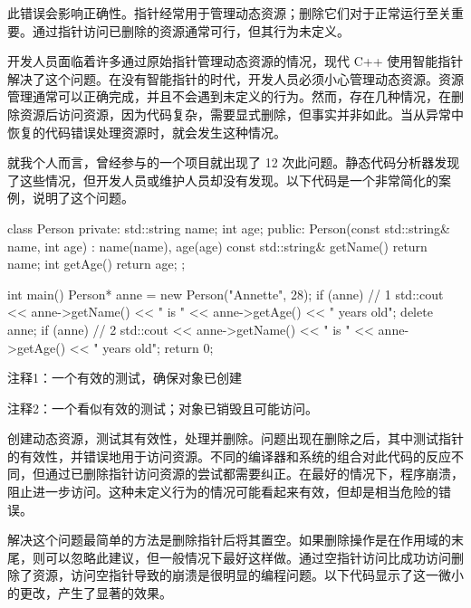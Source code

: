 此错误会影响正确性。指针经常用于管理动态资源；删除它们对于正常运行至关重要。通过指针访问已删除的资源通常可行，但其行为未定义。


开发人员面临着许多通过原始指针管理动态资源的情况，现代 C++ 使用智能指针解决了这个问题。在没有智能指针的时代，开发人员必须小心管理动态资源。资源管理通常可以正确完成，并且不会遇到未定义的行为。然而，存在几种情况，在删除资源后访问资源，因为代码复杂，需要显式删除，但事实并非如此。当从异常中恢复的代码错误处理资源时，就会发生这种情况。

就我个人而言，曾经参与的一个项目就出现了 12 次此问题。静态代码分析器发现了这些情况，但开发人员或维护人员却没有发现。以下代码是一个非常简化的案例，说明了这个问题。


\begin{cpp}
class Person {
private:
  std::string name;
  int age;
public:
  Person(const std::string& name, int age) : name(name), age(age) {}
  const std::string& getName() { return name; }
  int getAge() { return age; }
};

int main() {
  Person* anne = new Person("Annette", 28);
  if (anne) // 1
    std::cout << anne->getName() << " is " << anne->getAge()
      << " years old\n";
  delete anne;
  if (anne) // 2
    std::cout << anne->getName() << " is " << anne->getAge()
      << " years old\n";
  return 0;
}
\end{cpp}

{\footnotesize
注释1：一个有效的测试，确保对象已创建

注释2：一个看似有效的测试；对象已销毁且可能访问。
}


创建动态资源，测试其有效性，处理并删除。问题出现在删除之后，其中测试指针的有效性，并错误地用于访问资源。不同的编译器和系统的组合对此代码的反应不同，但通过已删除指针访问资源的尝试都需要纠正。在最好的情况下，程序崩溃，阻止进一步访问。这种未定义行为的情况可能看起来有效，但却是相当危险的错误。


解决这个问题最简单的方法是删除指针后将其置空。如果删除操作是在作用域的末尾，则可以忽略此建议，但一般情况下最好这样做。通过空指针访问比成功访问删除了资源，访问空指针导致的崩溃是很明显的编程问题。以下代码显示了这一微小的更改，产生了显著的效果。


